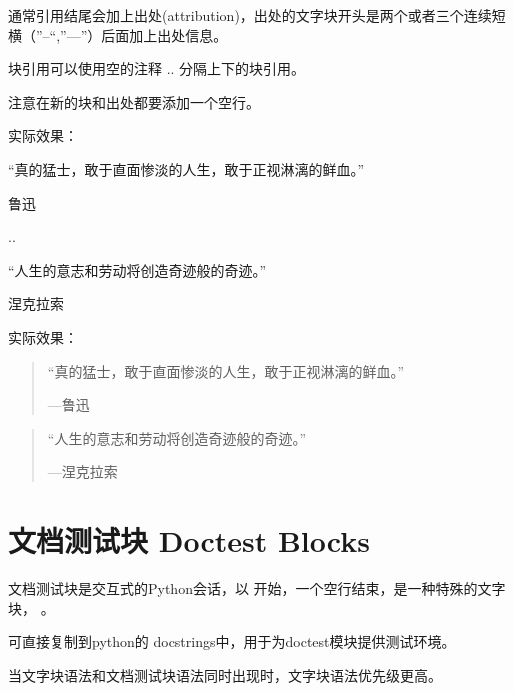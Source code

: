 \documentclass[a4paper,10pt,english]{sphinxmanual}
\begin{document}
\sphinxAtStartPar
通常引用结尾会加上出处(attribution)，出处的文字块开头是两个或者三个连续短横（”–“,”—”）后面加上出处信息。

\sphinxAtStartPar
块引用可以使用空的注释 .. 分隔上下的块引用。

\sphinxAtStartPar
注意在新的块和出处都要添加一个空行。

\sphinxAtStartPar
{}

\begin{sphinxVerbatim}[commandchars=\\\{\}]
实际效果：

    “真的猛士，敢于直面惨淡的人生，敢于正视淋漓的鲜血。”

    \PYGZhy{}\PYGZhy{}\PYGZhy{} 鲁迅

..

    “人生的意志和劳动将创造奇迹般的奇迹。”

    \PYGZhy{}\PYGZhy{} 涅克拉索
\end{sphinxVerbatim}

\sphinxAtStartPar
实际效果：
\begin{quote}

\sphinxAtStartPar
“真的猛士，敢于直面惨淡的人生，敢于正视淋漓的鲜血。”

\begin{flushright}
---鲁迅
\end{flushright}
\end{quote}
\begin{quote}

\sphinxAtStartPar
“人生的意志和劳动将创造奇迹般的奇迹。”

\begin{flushright}
---涅克拉索
\end{flushright}
\end{quote}


\section{文档测试块 Doctest Blocks}
\label{\detokenize{reStructureText_syntax:doctest-blocks}}
\sphinxAtStartPar
文档测试块是交互式的Python会话，以 \sphinxcode{\sphinxupquote{>>>}} 开始，一个空行结束，是一种特殊的文字块， 。

\sphinxAtStartPar
可直接复制到python的 docstrings中，用于为doctest模块提供测试环境。

\sphinxAtStartPar
当文字块语法和文档测试块语法同时出现时，文字块语法优先级更高。
\end{document}
